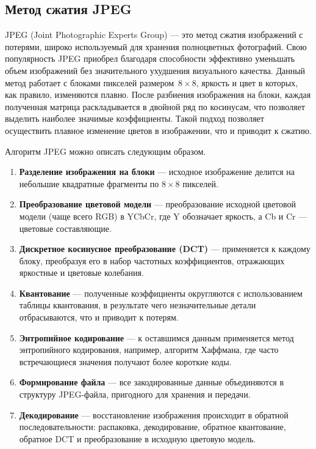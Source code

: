 \subsection{Метод сжатия JPEG}

JPEG (Joint Photographic Experts Group) \cite{JPEG} --- это метод сжатия изображений с потерями, широко используемый для хранения полноцветных фотографий. Свою популярность JPEG приобрел благодаря способности эффективно уменьшать объем изображений без значительного ухудшения визуального качества. Данный метод работает с блоками пикселей размером~$8 \times 8$, яркость и цвет в которых, как правило, изменяются плавно. После разбиения изображения на блоки, каждая полученная матрица раскладывается в двойной ряд по косинусам, что позволяет выделить наиболее значимые коэффициенты. Такой подход позволяет осуществить плавное изменение цветов в изображении, что и приводит к сжатию.

Алгоритм JPEG можно описать следующим образом.
\begin{enumerate}
    \item \textbf{Разделение изображения на блоки} --- исходное изображение делится на небольшие квадратные фрагменты по $8 \times 8$ пикселей.
    \item \textbf{Преобразование цветовой модели} --- преобразование исходной цветовой модели (чаще всего RGB) в YCbCr, где Y обозначает яркость, а Cb и Cr --- цветовые составляющие.
    \item \textbf{Дискретное косинусное преобразование (DCT)} --- применяется к каждому блоку, преобразуя его в набор частотных коэффициентов, отражающих яркостные и цветовые колебания.
    \item \textbf{Квантование} --- полученные коэффициенты округляются с использованием таблицы квантования, в результате чего незначительные детали отбрасываются, что и приводит к потерям.
    \item \textbf{Энтропийное кодирование} --- к оставшимся данным применяется метод энтропийного кодирования, например, алгоритм Хаффмана, где часто встречающиеся значения получают более короткие коды.
    \item \textbf{Формирование файла} --- все закодированные данные объединяются в структуру JPEG-файла, пригодного для хранения и передачи.
    \item \textbf{Декодирование} --- восстановление изображения происходит в обратной последовательности: распаковка, декодирование, обратное квантование, обратное DCT и преобразование в исходную цветовую модель.
\end{enumerate}

